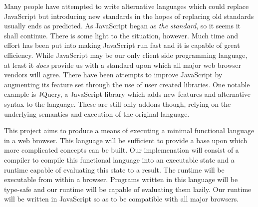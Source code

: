 Many people have attempted to
write alternative languages which could replace JavaScript but 
introducing new standards in the hopes of replacing old standards
usually ends as predicted. As JavaScript began as \emph{the
standard}, so it seems it shall continue. There is some light to the
situation, however. Much time and effort has been put into making 
JavaScript run fast and it is capable of great efficiency. While 
JavaScript may be our only client side programming language, at least
it \emph{does} provide us with a standard upon which all major web 
browser vendors will agree. There have been attempts
to improve JavaScript by augmenting its feature set through the use
of user created libraries. One notable example is JQuery, a JavaScript
library which adds new features and alternative syntax to the language.
These are still only addons though, relying on the underlying semantics
and execution of the original language. 

This project aims to produce a means of executing a minimal functional language in a
web browser. This language will be sufficient to provide a base upon which more 
complicated concepts can be built. Our implemenation will consist of a compiler to 
compile this functional language into an executable state and a runtime capable of 
evaluating this state to a result. The runtime will be executable from within a browser.
Programs written in this language will be type-safe and our runtime will be capable
of evaluating them lazily. Our runtime will be written in JavaScript so as to be 
compatible with all major browsers.